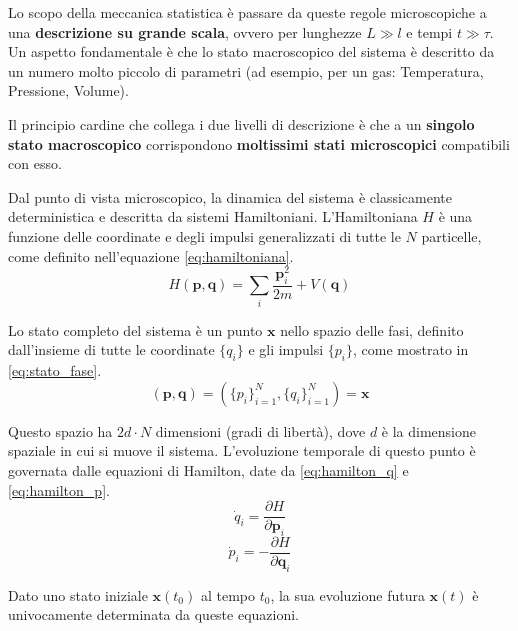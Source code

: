 Lo scopo della meccanica statistica è passare da queste regole microscopiche a una \textbf{descrizione su grande scala}, ovvero per lunghezze $L \gg l$ e tempi $t \gg \tau$. Un aspetto fondamentale è che lo stato macroscopico del sistema è descritto da un numero molto piccolo di parametri (ad esempio, per un gas: Temperatura, Pressione, Volume).

Il principio cardine che collega i due livelli di descrizione è che a un \textbf{singolo stato macroscopico} corrispondono \textbf{moltissimi stati microscopici} compatibili con esso.

\hspace{0.2 cm}

Dal punto di vista microscopico, la dinamica del sistema è classicamente deterministica e descritta da sistemi Hamiltoniani. L'Hamiltoniana $H$ è una funzione delle coordinate e degli impulsi generalizzati di tutte le $N$ particelle, come definito nell'equazione \eqref{eq:hamiltoniana}.
\begin{equation}
    H(\mathbf{p},\mathbf{q})=\sum_{i}\frac{\mathbf{p}_{i}^{2}}{2m}+V(\mathbf{q})
    \label{eq:hamiltoniana}
\end{equation}

Lo stato completo del sistema è un punto $\mathbf{x}$ nello spazio delle fasi, definito dall'insieme di tutte le coordinate $\{q_{i}\}$ e gli impulsi $\{p_{i}\}$, come mostrato in \eqref{eq:stato_fase}.
\begin{equation}
    (\mathbf{p},\mathbf{q})=(\{p_{i}\}_{i=1}^{N},\{q_{i}\}_{i=1}^{N})=\mathbf{x}
    \label{eq:stato_fase}
\end{equation}

Questo spazio ha $2d \cdot N$ dimensioni (gradi di libertà), dove $d$ è la dimensione spaziale in cui si muove il sistema. L'evoluzione temporale di questo punto è governata dalle equazioni di Hamilton, date da \eqref{eq:hamilton_q} e \eqref{eq:hamilton_p}.
\begin{equation}
    \dot{q}_{i}=\frac{\partial H}{\partial \mathbf{p}_{i}}
    \label{eq:hamilton_q}
\end{equation}
\begin{equation}
    \dot{p}_{i}=-\frac{\partial H}{\partial \mathbf{q}_{i}}
    \label{eq:hamilton_p}
\end{equation}

Dato uno stato iniziale $\mathbf{x}(t_0)$ al tempo $t_0$, la sua evoluzione futura $\mathbf{x}(t)$ è univocamente determinata da queste equazioni.

